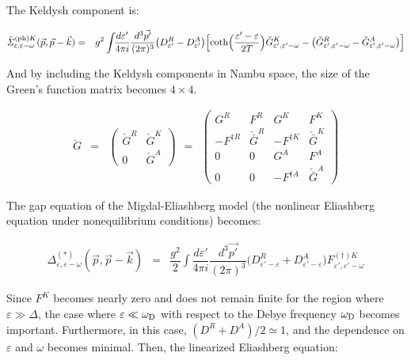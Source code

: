 \documentclass[uplatex,a4j,12pt,dvipdfmx]{jsarticle}
\begin{document}
The Keldysh component is:

\begin{eqnarray}
	\check{\mathit{\Sigma}}^{{(\rm ph)} K }_{\varepsilon , \varepsilon - \omega} (\vec{p} , \vec{p} - \vec{k})
	&=&
	g^{2} \int \!\! \dfrac{d \varepsilon'}{4 \pi i} \dfrac{d^{3} \vec{p'}}{ (2 \pi)^{3}}
	\big( D^{R}_{\varepsilon'} - D^{A}_{\varepsilon'} \big)
	\Big[
		{\rm coth} \Big( \dfrac{ \varepsilon' - \varepsilon }{2T} \Big)
		\check{G}^{K}_{ \varepsilon' , \varepsilon'- \omega }
		-
		\big( \check{G}^{R}_{ \varepsilon' , \varepsilon'- \omega } - \check{G}^{A}_{ \varepsilon' , \varepsilon'- \omega } \big)
		\Big]
\end{eqnarray}

And by including the Keldysh components in Nambu space, the size of the Green's function matrix becomes $4 \times 4$.

\begin{eqnarray}
	\breve{G}
	&=&
	\left(
	\begin{array}{cc}
			\check{G}^{R} & \check{G}^{K}
			\\
			0             & \check{G}^{A}
		\end{array}
	\right)
	\ \ = \ \
	\left(
	\begin{array}{cccc}
			G^{R}           & F^{R}               & G^{K}           & F^{K}
			\\
			- F^{\dagger R} & \check{\bar{G}}^{R} & - F^{\dagger K} & \check{\bar{G}}^{K}
			\\
			0               & 0                   & G^{A}           & F^{A}
			\\
			0               & 0                   & - F^{\dagger A} & \check{\bar{G}}^{A}
		\end{array}
	\right)
\end{eqnarray}

The gap equation of the Migdal-Eliashberg model (the nonlinear Eliashberg equation under nonequilibrium conditions) becomes:

\begin{eqnarray}
	\Delta_{\varepsilon , \varepsilon - \omega}^{(*)} (\vec{p} , \vec{p} - \vec{k})
	&=&
	\dfrac{g^{2}}{2}
	\int \!\! \dfrac{d \varepsilon'}{4 \pi i} \dfrac{d^{3} \vec{p'}}{ (2 \pi)^{3}}
	\big( D^{R}_{\varepsilon' - \varepsilon} + D^{A}_{\varepsilon' - \varepsilon} \big)
	F^{(\dagger)K}_{\varepsilon' , \varepsilon' - \omega}
\end{eqnarray}

Since $F^{K}$ becomes nearly zero and does not remain finite for the region where $\varepsilon \gg \Delta$, the case where $\varepsilon \ll \omega_{\rm D}$ with respect to the Debye frequency $\omega_{\rm D}$ becomes important.
Furthermore, in this case, $(D^{R} + D^{A})/2 \simeq 1$, and the dependence on $\varepsilon$ and $\omega$ becomes minimal. Then, the linearized Eliashberg equation:
\end{document}
